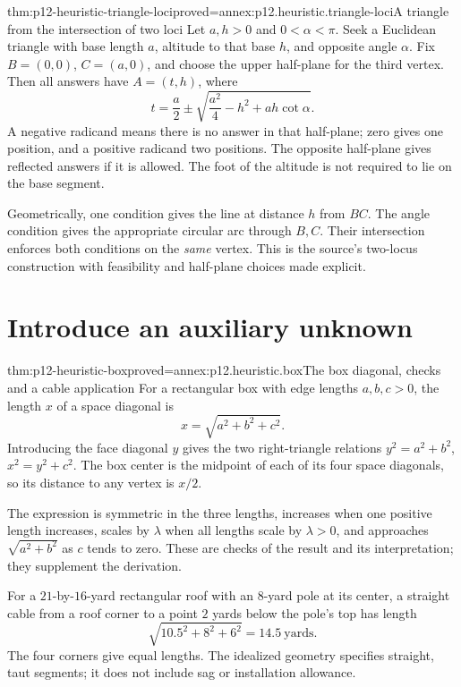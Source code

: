 \begin{hbtheorem}{thm:p12-heuristic-triangle-loci}{proved=annex:p12.heuristic.triangle-loci}{A triangle from the intersection of two loci}
Let \(a,h>0\) and \(0<\alpha<\pi\). Seek a Euclidean triangle
with base length \(a\), altitude to that base \(h\), and opposite
angle \(\alpha\). Fix \(B=(0,0)\), \(C=(a,0)\), and choose
the upper half-plane for the third vertex. Then all answers have
\(A=(t,h)\), where
\[
 t=\frac a2\mathbin{\pm}
       \sqrt{\frac{a^2}{4}-h^2+ah\cot\alpha}.
\]
A negative radicand means there is no answer in that half-plane;
zero gives one position, and a positive radicand two positions.
The opposite half-plane gives reflected answers if it is allowed.
The foot of the altitude is not required to lie on the base segment.

Geometrically, one condition gives the line at distance \(h\)
from \(BC\). The angle condition gives the appropriate circular
arc through \(B,C\). Their intersection enforces both conditions
on the \emph{same} vertex. This is the source's two-locus construction
with feasibility and half-plane choices made explicit.
\end{hbtheorem}

\section{Introduce an auxiliary unknown}

\begin{hbtheorem}{thm:p12-heuristic-box}{proved=annex:p12.heuristic.box}{The box diagonal, checks and a cable application}
For a rectangular box with edge lengths \(a,b,c>0\), the length
\(x\) of a space diagonal is
\[
                  x=\sqrt{a^2+b^2+c^2}.
\]
Introducing the face diagonal \(y\) gives the two right-triangle
relations \(y^2=a^2+b^2\), \(x^2=y^2+c^2\). The box center
is the midpoint of each of its four space diagonals, so its distance
to any vertex is \(x/2\).

The expression is symmetric in the three lengths, increases when
one positive length increases, scales by \(\lambda\) when all
lengths scale by \(\lambda>0\), and approaches
\(\sqrt{a^2+b^2}\) as \(c\) tends to zero. These are checks
of the result and its interpretation; they supplement the derivation.

For a \(21\)-by-\(16\)-yard rectangular roof with an \(8\)-yard
pole at its center, a straight cable from a roof corner to a point
\(2\) yards below the pole's top has length
\[
                  \sqrt{10.5^2+8^2+6^2}=14.5\ \text{yards}.
\]
The four corners give equal lengths. The idealized geometry specifies
straight, taut segments; it does not include sag or installation allowance.
\end{hbtheorem}

